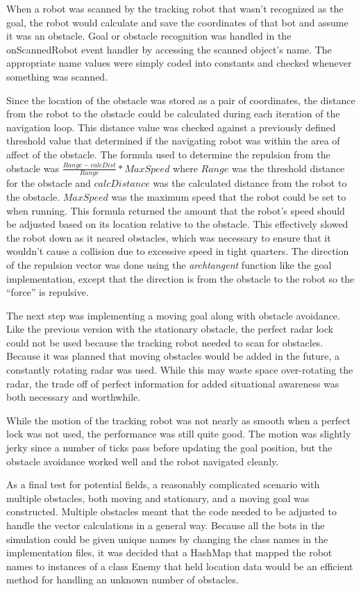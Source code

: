 \documentclass{aiaa-tc}%
\begin{document}
When a robot was scanned by the tracking robot that wasn't recognized as the goal, the robot would calculate and save the coordinates of that bot and assume it was an obstacle. Goal or obstacle recognition was handled in the onScannedRobot event handler by accessing the scanned object's name. The appropriate name values were simply coded into constants and checked whenever something was scanned.

Since the location of the obstacle was stored as a pair of coordinates, the distance from the robot to the obstacle could be calculated during each iteration of the navigation loop. This distance value was checked against a previously defined threshold value that determined if the navigating robot was within the area of affect of the obstacle. The formula used to determine the repulsion from the obstacle was $\frac{Range - calcDist}{Range} * MaxSpeed$ where $Range$ was the threshold distance for the obstacle and $calcDistance$ was the calculated distance from the robot to the obstacle. $MaxSpeed$ was the maximum speed that the robot could be set to when running. This formula returned the amount that the robot's speed should be adjusted based on its location relative to the obstacle. This effectively slowed the robot down as it neared obstacles, which was necessary to ensure that it wouldn't cause a collision due to excessive speed in tight quarters. The direction of the repulsion vector was done using the \emph{archtangent} function like the goal implementation, except that the direction is from the obstacle to the robot so the ``force'' is repulsive.

The next step was implementing a moving goal along with obstacle avoidance. Like the previous version with the stationary obstacle, the perfect radar lock could not be used because the tracking robot needed to scan for obstacles. Because it was planned that moving obstacles would be added in the future, a constantly rotating radar was used. While this may waste space over-rotating the radar, the trade off of perfect information for added situational awareness was both necessary and worthwhile. 

While the motion of the tracking robot was not nearly as smooth when a perfect lock was not used, the performance was still quite good. The motion was slightly jerky since a number of ticks pass before updating the goal position, but the obstacle avoidance worked well and the robot navigated cleanly.

As a final test for potential fields, a reasonably complicated scenario with multiple obstacles, both moving and stationary, and a moving goal was constructed. Multiple obstacles meant that the code needed to be adjusted to handle the vector calculations in a general way. Because all the bots in the simulation could be given unique names by changing the class names in the implementation files, it was decided that a HashMap that mapped the robot names to instances of a class Enemy that held location data would be an efficient method for handling an unknown number of obstacles. 
\end{document}
